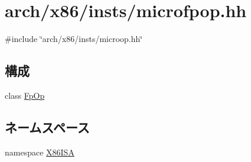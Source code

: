 \hypertarget{microfpop_8hh}{
\section{arch/x86/insts/microfpop.hh}
\label{microfpop_8hh}
}
{\ttfamily \#include \char`\"{}arch/x86/insts/microop.hh\char`\"{}}\par
\subsection*{構成}
\begin{DoxyCompactItemize}
\item 
class \hyperlink{classX86ISA_1_1FpOp}{FpOp}
\end{DoxyCompactItemize}
\subsection*{ネームスペース}
\begin{DoxyCompactItemize}
\item 
namespace \hyperlink{namespaceX86ISA}{X86ISA}
\end{DoxyCompactItemize}

